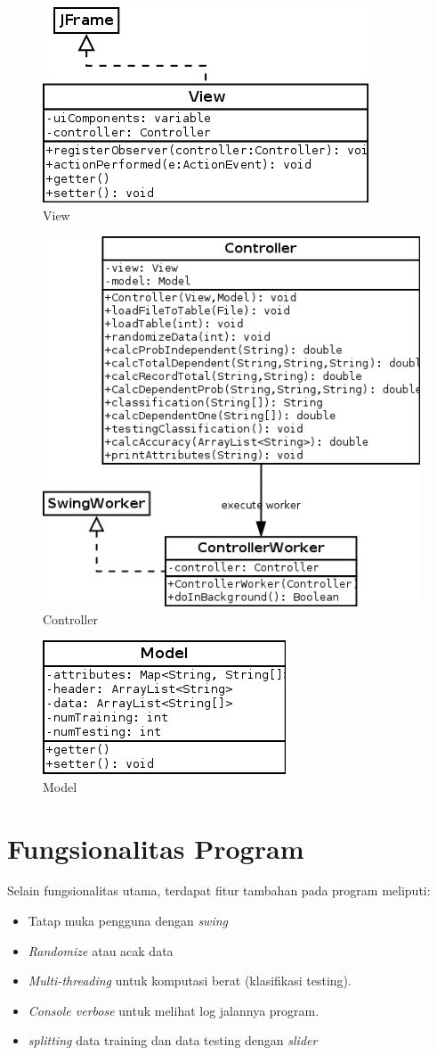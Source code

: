 \documentclass[11pt,a4paper]{report}
\begin{document}
	\begin{figure}[h]
	\centering
	\includegraphics[width=0.5\linewidth]{view}
	\caption{View}
	\label{fig:view}
	\end{figure}
	\newpage
	\begin{figure}[h]
	\centering
	\includegraphics[width=0.7\linewidth]{controller}
	\caption{Controller}
	\label{fig:controller}
	\end{figure}
	
	\begin{figure}[h]
	\centering
	\includegraphics[width=0.5\linewidth]{model}
	\caption{Model}
	\label{fig:model}
	\end{figure}
	\newpage
	\section*{Fungsionalitas Program}
	Selain fungsionalitas utama, terdapat fitur tambahan pada program meliputi:
	\begin{itemize}
		\item Tatap muka pengguna dengan \emph{swing}
		\item \emph{Randomize} atau acak data
		\item \emph{Multi-threading} untuk komputasi berat (klasifikasi testing).
		\item \emph{Console verbose} untuk melihat log jalannya program.
		\item \emph{splitting} data training dan data testing dengan \emph{slider}  
	\end{itemize}
\end{document}
